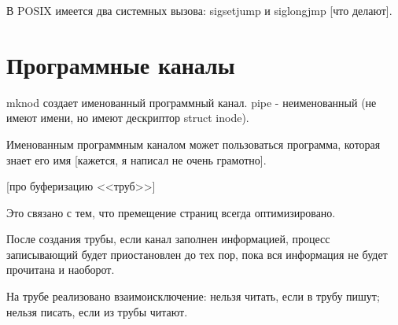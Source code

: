 \documentclass[a4paper, 12pt]{report}
\begin{document}
	В POSIX имеется два системных вызова: sigsetjump и siglongjmp [что делают].
	
	\section*{Программные каналы}
	
	mknod создает именованный программный канал. pipe - неименованный (не имеют имени, но имеют дескриптор struct inode).
	
	Именованным программным каналом может пользоваться программа, которая знает его имя [кажется, я написал не очень грамотно].
	
	[про буферизацию <<труб>>]
	
	Это связано с тем, что премещение страниц всегда оптимизировано.
	
	После создания трубы, если канал заполнен информацией, процесс записывающий будет приостановлен до тех пор, пока вся информация не будет прочитана и наоборот.
	
	На трубе реализовано взаимоисключение: нельзя читать, если в трубу пишут; нельзя писать, если из трубы читают.
\end{document}
